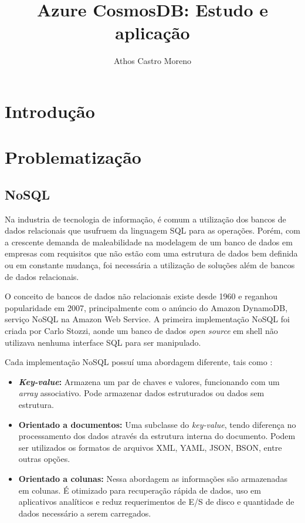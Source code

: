 \documentclass[12pt]{article}
\title{Azure CosmosDB: Estudo e aplicação}
\author{Athos Castro Moreno}
\begin{document}
 

\maketitle

\begin{resumo} 
\end{resumo}

\section{Introdução}

\section{Problematização} 

\subsection{NoSQL}
Na industria de tecnologia de informação, é comum a utilização dos bancos de dados relacionais que usufruem da linguagem SQL para as operações. Porém, com a crescente demanda
de maleabilidade na modelagem de um banco de dados em empresas com requisitos que não estão com uma estrutura de dados bem definida ou em constante mudança, foi necessária a 
utilização de soluções além de bancos de dados relacionais.

O conceito de bancos de dados não relacionais existe desde 1960 e reganhou popularidade em 2007, principalmente com o anúncio do Amazon DynamoDB, serviço NoSQL na Amazon Web Service.
A primeira implementação NoSQL foi criada por Carlo Stozzi, aonde um banco de dados \textit{open source} em shell não utilizava nenhuma interface SQL para ser manipulado. 

Cada implementação NoSQL possuí uma abordagem diferente, tais como \cite{Lith2010}:

\begin{itemize}
	\item \textbf{\textit{Key-value}:} Armazena um par de chaves e valores, funcionando com um \textit{array} associativo. Pode armazenar dados estruturados ou dados sem estrutura.
	\item \textbf{Orientado a documentos:} Uma subclasse do \textit{key-value}, tendo diferença no processamento dos dados através da estrutura interna do documento. Podem ser utilizados 
	os formatos de arquivos XML, YAML, JSON, BSON, entre outras opções.
	\item \textbf{Orientado a colunas:} Nessa abordagem as informações são armazenadas em colunas. É otimizado para recuperação rápida de dados, uso em aplicativos 
	analíticos e reduz requerimentos de E/S de disco e quantidade de dados necessário a serem carregados.
\end{itemize}
\end{document}
